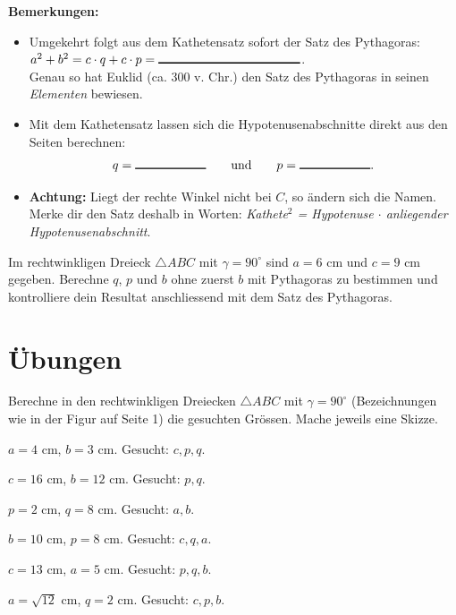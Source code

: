 \documentclass[11pt,oneside]{article}
\begin{document}
\textbf{Bemerkungen:}
\begin{itemize}
	\item Umgekehrt folgt aus dem Kathetensatz sofort der Satz des Pythagoras: $a^2+b^2=c\cdot q+c\cdot p=\gap{4}$.\\[2mm] Genau so hat Euklid (ca. 300 v. Chr.) den Satz des Pythagoras in seinen \textit{Elementen} bewiesen.
	\item Mit dem Kathetensatz lassen sich die Hypotenusenabschnitte direkt aus den Seiten berechnen: \[q=\gap{2} \qquad\text{und}\qquad p=\gap{2}.\]
	\item \textbf{Achtung:} Liegt der rechte Winkel nicht bei $C$, so ändern sich die Namen. Merke dir den Satz deshalb in Worten: \textit{Kathete$^2$ = Hypotenuse $\cdot$ anliegender Hypotenusenabschnitt}.
\end{itemize}

\begin{beispiel}
	Im rechtwinkligen Dreieck $\triangle ABC$ mit $\gamma=90^\circ$ sind $a=6$ cm und $c=9$ cm gegeben. Berechne $q$, $p$ und $b$ ohne zuerst $b$ mit Pythagoras zu bestimmen und kontrolliere dein Resultat anschliessend mit dem Satz des Pythagoras.
\end{beispiel}

\section{Übungen}
\setcounter{aufg}{0}
\begin{aufgabe}[Grundaufgaben] %
	Berechne in den rechtwinkligen Dreiecken $\triangle ABC$ mit $\gamma=90^\circ$ (Bezeichnungen wie in der Figur auf Seite 1) die gesuchten Grössen. Mache jeweils eine Skizze.
	\begin{enumcols}[2]
		\item $a=4$ cm, $b=3$ cm. Gesucht: $c,p,q$.
		\item $c=16$ cm, $b=12$ cm. Gesucht: $p,q$.
		\item $p=2$ cm, $q=8$ cm. Gesucht: $a,b$.
		\item $b=10$ cm, $p=8$ cm. Gesucht: $c,q,a$.
		\item $c=13$ cm, $a=5$ cm. Gesucht: $p,q,b$.
		\item $a=\sqrt{12}$ cm, $q=2$ cm. Gesucht: $c,p,b$.
	\end{enumcols}
\end{aufgabe}
\end{document}
